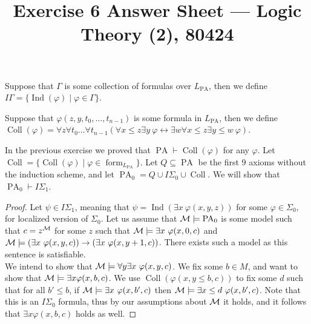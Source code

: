 
\title{Exercise 6 Answer Sheet --- Logic Theory (2), 80424}

\DeclareMathOperator{\PA}{PA}
\DeclareMathOperator{\Coll}{Coll}
\DeclareMathOperator{\Ind}{Ind}


\maketitle
\maketitleprint[yellow]

\question{}
\begin{notation}
	Suppose that $\Gamma$ is some collection of formulas over $L_{\PA}$,
	then we define $I \Gamma = \{ \Ind(\varphi) \mid \varphi \in \Gamma \}$.
\end{notation}
\begin{notation}
	Suppose that $\varphi(z, y, t_0, \ldots, t_{n - 1})$ is some formula in $L_{\PA}$,
	then we define $\Coll(\varphi) = \forall z \forall t_0 \ldots \forall t_{n - 1} (\forall x \le z \exists y\ \varphi \leftrightarrow \exists w \forall x \le z \exists y \le w\ \varphi)$.
\end{notation}
In the previous exercise we proved that $\PA \vdash \Coll(\varphi)$ for any $\varphi$.
Let $\Coll = \{ \Coll(\varphi) \mid \varphi \in \operatorname{form}_{L_{\PA}} \}$.
Let $Q \subseteq \PA$ be the first 9 axioms without the induction scheme, and let $\PA_0 = Q \cup I \Sigma_0 \cup \Coll$.
We will show that $\PA_0 \vdash I \Sigma_1$.
\begin{proof}
	Let $\psi \in I \Sigma_1$, meaning that $\psi = \Ind(\exists x\ \varphi(x, y, z))$ for some $\varphi \in \Sigma_0$, for localized version of $\Sigma_0$.
	Let us assume that $\Mm \models \PA_0$ is some model such that $c = z^{\mathcal{M}}$ for some $z$ such that $\mathcal{M} \models \exists x\ \varphi(x, 0, c)$ and $\Mm \models (\exists x\ \varphi(x, y, c)) \to (\exists x\ \varphi(x, y + 1, c))$.
	There exists such a model as this sentence is satisfiable. \\
	We intend to show that $\mathcal{M} \models \forall y \exists x\ \varphi(x, y, c)$.
	We fix some $b \in M$, and want to show that $\mathcal{M} \models \exists x \varphi(x, b, c)$.
	We use $\Coll(\varphi(x, y \le b, c))$ to fix some $d$ such that for all $b' \le b$, if $\mathcal{M} \models \exists x\ \varphi(x, b', c)$ then $\Mm \models \exists x \le d\ \varphi(x, b', c)$.
	Note that this is an $I \Sigma_0$ formula, thus by our assumptions about $\mathcal{M}$ it holds, and it follows that $\exists x \varphi(x, b, c)$ holds as well.
\end{proof}

